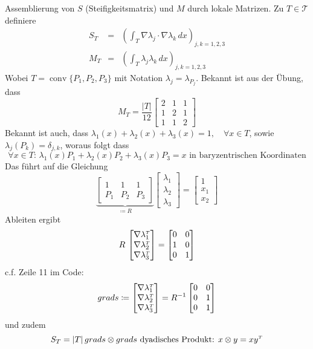 \documentclass[oneside,a4paper]{amsart}
\newcommand{\tp}{\ensuremath{\mathsmaller T}}
\begin{document}
Assemblierung von $S$ (Steifigkeitsmatrix) und $M$ durch lokale Matrizen. Zu $T\in\mathcal{T}$ definiere
\begin{eqnarray*}
		S_T &=& \left(\int_T\nabla\lambda_j\cdot\nabla\lambda_k\,dx\right)_{j,k = 1,2,3}\\
		M_T &=& \left(\int_T \lambda_j\lambda_k\,dx\right)_{j,k = 1,2,3}
\end{eqnarray*}
Wobei $T = \operatorname{conv}\{P_1,P_2,P_3\}$ mit Notation $\lambda_j = \lambda_{P_j}$. Bekannt ist aus der Übung, dass
\[
	M_T = \frac{\vert T\vert}{12}\begin{bmatrix}2&1&1\\1&2&1\\1&1&2\end{bmatrix}
\]
Bekannt ist auch, dass $\lambda_1(x) + \lambda_2(x) + \lambda_3(x) = 1,\quad\forall x\in T$, sowie $\lambda_j(P_k) = \delta_{j,k}$, woraus folgt dass
\[
	\forall x\in T:\,\lambda_1(x)P_1 + \lambda_2(x)P_2 + \lambda_3(x)P_3 = x\text{ in baryzentrischen Koordinaten}
\]
Das führt auf die Gleichung
\[
	\underbrace{\begin{bmatrix} 1&1&1\\P_1&P_2&P_3\end{bmatrix}}_{\coloneqq R}\begin{bmatrix}\lambda_1\\ \lambda_2\\ \lambda_3\end{bmatrix} = \begin{bmatrix} 1 \\ x_1 \\ x_2\end{bmatrix}
\]
Ableiten ergibt
\[
	R\,\begin{bmatrix}\nabla\lambda_1^\tp\\ \nabla\lambda_2^\tp\\ \nabla\lambda_3^\tp\end{bmatrix} = \begin{bmatrix} 0 & 0 \\ 1 & 0\\ 0 & 1 \end{bmatrix}
\]
c.f. Zeile 11 im Code:
\[
	grads\coloneqq\begin{bmatrix} \nabla\lambda_1^\tp\\ \nabla\lambda_2^\tp\\ \nabla\lambda_3^\tp\end{bmatrix} = R^{-1} \begin{bmatrix}0 & 0 \\ 0 & 1 \\ 0 & 1\end{bmatrix}
\]
und zudem
\[
	S_T = \vert T \vert\, grads \otimes grads\text{ dyadisches Produkt: }x\otimes y = xy^\tp
\]
\end{document}
